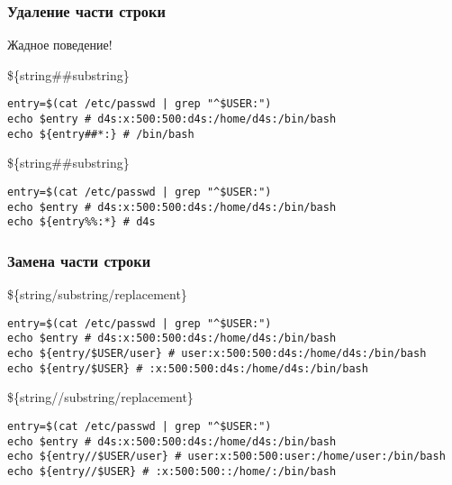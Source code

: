 \begin{frame}[fragile]
	\frametitle{Удаление части строки}

	\large{Жадное поведение!}

	\begin{block}{\$\{string\#\#substring\}}
	\begin{lstlisting}
entry=$(cat /etc/passwd | grep "^$USER:")
echo $entry # d4s:x:500:500:d4s:/home/d4s:/bin/bash
echo ${entry##*:} # /bin/bash
	\end{lstlisting}
	\end{block}
	\pause
	\begin{block}{\$\{string\#\#substring\}}
	\begin{lstlisting}
entry=$(cat /etc/passwd | grep "^$USER:")
echo $entry # d4s:x:500:500:d4s:/home/d4s:/bin/bash
echo ${entry%%:*} # d4s
	\end{lstlisting}
	\end{block}
\end{frame}


\begin{frame}[fragile]
	\frametitle{Замена части строки}

	\begin{block}{\$\{string/substring/replacement\}}
	\begin{lstlisting}
entry=$(cat /etc/passwd | grep "^$USER:")
echo $entry # d4s:x:500:500:d4s:/home/d4s:/bin/bash
echo ${entry/$USER/user} # user:x:500:500:d4s:/home/d4s:/bin/bash
echo ${entry/$USER} # :x:500:500:d4s:/home/d4s:/bin/bash
	\end{lstlisting}
	\end{block}

	\pause
	\begin{block}{\$\{string//substring/replacement\}}
	\begin{lstlisting}
entry=$(cat /etc/passwd | grep "^$USER:")
echo $entry # d4s:x:500:500:d4s:/home/d4s:/bin/bash
echo ${entry//$USER/user} # user:x:500:500:user:/home/user:/bin/bash
echo ${entry//$USER} # :x:500:500::/home/:/bin/bash
	\end{lstlisting}
	\end{block}

\end{frame}

